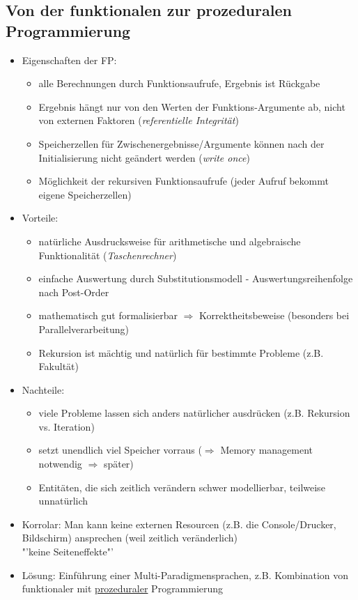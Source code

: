 \documentclass{article}
\begin{document}
	 	\subsection{Von der funktionalen zur prozeduralen Programmierung}
	 	\begin{itemize}
	 		\item Eigenschaften der FP:
	 		\begin{itemize}
	 			\item alle Berechnungen durch Funktionsaufrufe, Ergebnis ist Rückgabe
	 			\item Ergebnis hängt nur von den Werten der Funktions-Argumente ab, nicht von externen Faktoren (\textit{referentielle Integrität})
	 			\item Speicherzellen für Zwischenergebnisse/Argumente können nach der Initialisierung nicht geändert werden (\textit{write once})
	 			\item Möglichkeit der rekursiven Funktionsaufrufe (jeder Aufruf bekommt eigene Speicherzellen)
	 		\end{itemize}
	 		\item Vorteile:
	 		\begin{itemize}
	 			\item natürliche Ausdrucksweise für arithmetische und algebraische Funktionalität (\textit{Taschenrechner})
	 			\item einfache Auswertung durch Substitutionsmodell - Auswertungsreihenfolge nach Post-Order
	 			\item mathematisch gut formalisierbar $\Rightarrow$ Korrektheitsbeweise (besonders bei Parallelverarbeitung)
	 			\item Rekursion ist mächtig und natürlich für bestimmte Probleme (z.B. Fakultät)
	 		\end{itemize}
	 		\item Nachteile:
	 		\begin{itemize}
	 			\item viele Probleme lassen sich anders natürlicher ausdrücken (z.B. Rekursion vs. Iteration)
	 			\item setzt unendlich viel Speicher vorraus ($\Rightarrow$ Memory management notwendig $\Rightarrow$ später)
	 			\item Entitäten, die sich zeitlich verändern schwer modellierbar, teilweise unnatürlich
	 		\end{itemize}
	 		\item Korrolar: Man kann keine externen Resourcen (z.B. die Console/Drucker, Bildschirm) ansprechen (weil zeitlich veränderlich) \\ "'keine Seiteneffekte"'
	 		\item Lösung: Einführung einer Multi-Paradigmensprachen, z.B. Kombination von funktionaler mit \underline{prozeduraler} Programmierung
	 	\end{itemize}
	 	
\end{document}
